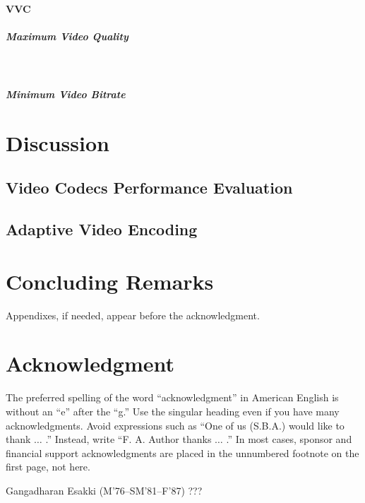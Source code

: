 \documentclass{ieeeaccess}
\begin{document}
\paragraph{VVC}
\subparagraph{Maximum Video Quality}
\\
\subparagraph{Minimum Video Bitrate}

\section{Discussion}

\subsection{Video Codecs Performance Evaluation}

\subsection{Adaptive Video Encoding}

\section{Concluding Remarks}
\appendices
Appendixes, if needed, appear before the acknowledgment.

\section*{Acknowledgment}
The preferred spelling of the word ``acknowledgment'' in American English is 
without an ``e'' after the ``g.'' Use the singular heading even if you have 
many acknowledgments. Avoid expressions such as ``One of us (S.B.A.) would 
like to thank $\ldots$ .'' Instead, write ``F. A. Author thanks $\ldots$ .'' In most 
cases, sponsor and financial support acknowledgments are placed in the 
unnumbered footnote on the first page, not here.

\begin{IEEEbiography}{Gangadharan Esakki} (M'76--SM'81--F'87) ???
\end{IEEEbiography}
\end{document}
